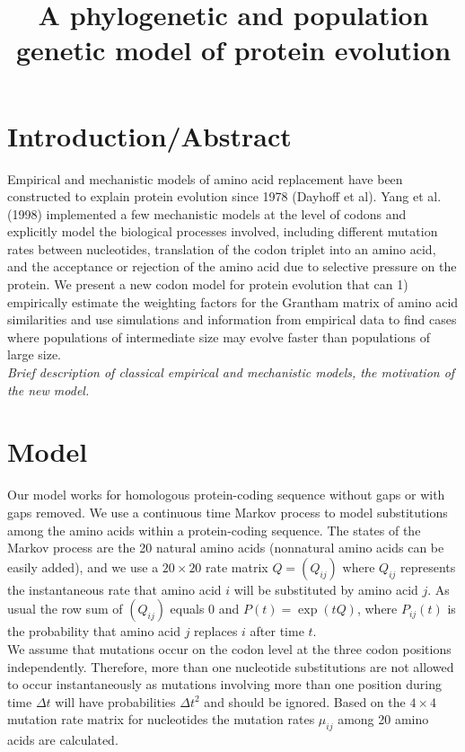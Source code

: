 \documentclass[13pt]{article}
\title{A phylogenetic and population genetic model of protein evolution}
\author{}
\begin{document}
\maketitle
\section{Introduction/Abstract}
Empirical and mechanistic models of amino acid replacement have been constructed to explain protein evolution since 1978 (Dayhoff et al). Yang et al. (1998) implemented a few mechanistic models at the level of codons and explicitly model the biological processes involved, including different mutation rates between nucleotides, translation of the codon triplet into an amino acid, and the acceptance or rejection of the amino acid due to selective pressure on the protein. We present a new codon model for protein evolution that can 1) empirically estimate the weighting factors for the Grantham matrix of amino acid similarities and use simulations and information from empirical data to find cases where populations of intermediate size may evolve faster than populations of large size.\\

\textit{Brief description of classical empirical and mechanistic models, the motivation of the new model.}
\section{Model}
Our model works for homologous protein-coding sequence without gaps or with gaps removed. We use a continuous time Markov process to model substitutions among the amino acids within a protein-coding sequence. The states of the Markov process are the 20 natural amino acids (nonnatural amino acids can be easily added), and we use a $20 \times 20$ rate matrix $Q=(Q_{ij})$ where $Q_{ij}$ represents the instantaneous rate that amino acid $i$ will be substituted by amino acid $j$. As usual the row sum of $(Q_{ij})$ equals $0$ and $P(t) = \exp (tQ)$, where $P_{ij}(t)$ is the probability that amino acid $j$ replaces $i$ after time $t$. \\

We assume that mutations occur on the codon level at the three codon positions independently. Therefore, more than one nucleotide substitutions are not allowed to occur instantaneously as mutations involving more than one position during time $\Delta t$ will have probabilities $\Delta t^2$ and should be ignored. Based on the $4 \times 4$ mutation rate matrix for nucleotides the mutation rates $\mu_{ij}$ among 20 amino acids are calculated.
\end{document}
